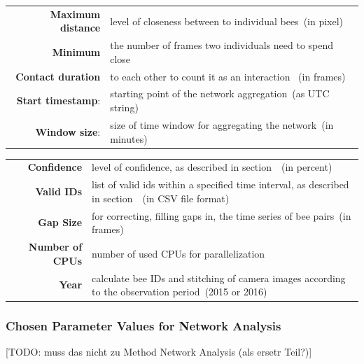 \begin{table}[htbp]
\centering
\begin{tabularx}{\textwidth}{@{} r Y @{}}
\textbf{Maximum distance} & level of closeness between to individual bees~(in pixel) \vspace{3mm} \\
\textbf{Minimum} & the number of frames two individuals need to spend close\\
\textbf{Contact duration} &  to each other to count it as an interaction ~(in frames) \vspace{3mm} \\
\textbf{Start timestamp}: & starting point of the network aggregation~(as UTC string) \vspace{3mm} \\
\textbf{Window size}: & size of time window for aggregating the network~(in minutes) \\
\end{tabularx}
\end{table}

\begin{table}[htbp]
\centering
\begin{tabularx}{\textwidth}{@{} r Y @{}}
\textbf{Confidence} & level of confidence, as described in section~~(in percent) \vspace{3mm}\\
\textbf{Valid IDs} & list of valid ids within a specified time interval, as described in section~~(in CSV file format) \vspace{3mm}\\
\textbf{Gap Size} & for correcting, filling gaps in, the time series of bee pairs~(in frames) \vspace{3mm}\\
\textbf{Number of CPUs} & number of used CPUs for parallelization \vspace{3mm}\\
\textbf{Year} & calculate bee IDs and stitching of camera images according to the observation period~(2015 or 2016)\\
\end{tabularx}
\end{table}

\subsubsection{Chosen Parameter Values for Network Analysis}
[TODO: muss das nicht zu Method Network Analysis (als ersetr Teil?)]

